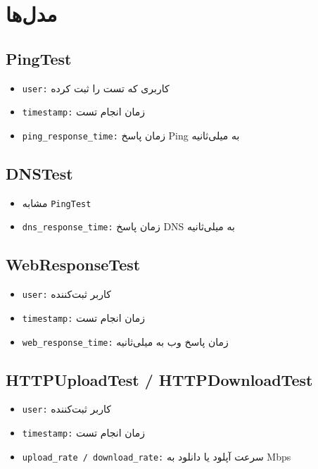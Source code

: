 \documentclass{report}
\begin{document}
\section{مدل‌ها}

\subsection{PingTest}
\begin{itemize}
    \item \texttt{user:} کاربری که تست را ثبت کرده
    \item \texttt{timestamp:} زمان انجام تست
    \item \texttt{ping\_response\_time:} زمان پاسخ Ping به میلی‌ثانیه
\end{itemize}

\subsection{DNSTest}
\begin{itemize}
    \item مشابه \texttt{PingTest}
    \item \texttt{dns\_response\_time:} زمان پاسخ DNS به میلی‌ثانیه
\end{itemize}

\subsection{WebResponseTest}
\begin{itemize}
    \item \texttt{user:} کاربر ثبت‌کننده
    \item \texttt{timestamp:} زمان انجام تست
    \item \texttt{web\_response\_time:} زمان پاسخ وب به میلی‌ثانیه
\end{itemize}

\subsection{HTTPUploadTest / HTTPDownloadTest}
\begin{itemize}
    \item \texttt{user:} کاربر ثبت‌کننده
    \item \texttt{timestamp:} زمان انجام تست
    \item \texttt{upload\_rate / download\_rate:} سرعت آپلود یا دانلود به Mbps
\end{itemize}
\end{document}
